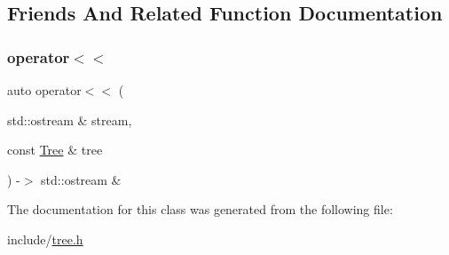 \subsection{Friends And Related Function Documentation}
\mbox{\label{class_b_s_t_tree_1_1_tree_a4df8fc028c7dd645f2d9507fcc0fa407}} 
\subsubsection{\texorpdfstring{operator$<$$<$}{operator<<}}
{\footnotesize\ttfamily auto operator$<$$<$ (\begin{DoxyParamCaption}\item[{std\+::ostream \&}]{stream,  }\item[{const \mbox{\hyperlink{class_b_s_t_tree_1_1_tree}{Tree}} \&}]{tree }\end{DoxyParamCaption}) -\/$>$  std\+::ostream \&\hspace{0.3cm}{\ttfamily [friend]}}



The documentation for this class was generated from the following file\+:\begin{DoxyCompactItemize}
\item 
include/\mbox{\hyperlink{tree_8h}{tree.\+h}}\end{DoxyCompactItemize}
